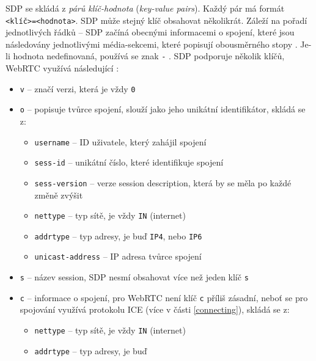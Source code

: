 SDP se skládá z \textit{párů klíč-hodnota} (\textit{key-value pairs}). Každý pár
má formát \texttt{<klíč>=<hodnota>}. SDP může stejný klíč obsahovat
několikrát. Záleží na pořadí jednotlivých řádků -- SDP začíná obecnými
informacemi o spojení, které jsou následovány jednotlivými média-sekcemi, které
popisují obousměrného stopy \cite{WebRTCForTheCurious}. Je-li hodnota
nedefinovaná, používá se znak \texttt{-} \cite{IETF-RFC8866}. SDP
podporuje několik klíčů, WebRTC využívá následující
\cite{WebRTCForTheCurious,IETF-RFC8866}:

\begin{itemize}
	\item \texttt{v} -- značí verzi, která je vždy \texttt{0}
	\item \texttt{o} -- popisuje tvůrce spojení, slouží jako jeho
	      unikátní identifikátor, skládá se z:
	      \begin{itemize}
		      \item \texttt{username} -- ID uživatele, který zahájil spojení
		      \item \texttt{sess-id} -- unikátní číslo, které
		            identifikuje spojení
		      \item \texttt{sess-version} -- verze session
		            description, která by se měla po každé změně zvýšit
		      \item \texttt{nettype} -- typ sítě, je vždy
		            \texttt{IN} (internet)
		      \item \texttt{addrtype} -- typ adresy, je buď
		            \texttt{IP4}, nebo \texttt{IP6}
		      \item \texttt{unicast-address} -- IP adresa tvůrce spojení
	      \end{itemize}
	\item \texttt{s} -- název session, SDP nesmí obsahovat více než
	      jeden klíč \texttt{s}
	\item \texttt{c} -- informace o spojení, pro WebRTC není klíč
	      \texttt{c} příliš zásadní, neboť se pro spojování využívá
	      protokolu ICE (více v části \ref{connecting}), skládá se z:
	      \begin{itemize}
		      \item \texttt{nettype} -- typ sítě, je vždy
		            \texttt{IN} (internet)
		      \item \texttt{addrtype} -- typ adresy, je buď

\end{itemize}
\end{itemize}
